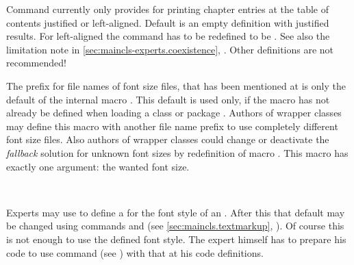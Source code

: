 \begin{Declaration}
\end{Declaration}
%
Command  currently only provides for printing
chapter entries at the table of contents justified or left-aligned. Default is
an empty definition with justified results. For left-aligned the command has
to be redefined to be
. See
also the limitation note in \autoref{sec:maincls-experts.coexistence},
. Other definitions are
not recommended!%
%



\begin{Declaration}
\end{Declaration}
%
The prefix  for file names of font size files, that has been
mentioned at
 is only the default of the
internal macro . This
default is used only, if the macro has not already be defined when loading a
\KOMAScript{} class or package . Authors of wrapper classes
may define this macro with another file name prefix to use completely
different font size files. Also authors of wrapper classes
could change or deactivate the \emph{fallback} solution for unknown font sizes
by redefinition of macro
%
. This macro has exactly one argument: the wanted
font size.%
%
%

\begin{Declaration}
                     \\
\end{Declaration}
%
%
Experts may use  to define a  for the font
style of an . After this that default may be changed using
commands  and  (see
\autoref{sec:maincls.textmarkup},
). Of course this is not enough to
use the defined font style. The expert himself has to prepare his code to use
command
 (see
) with that  at his
code definitions.

